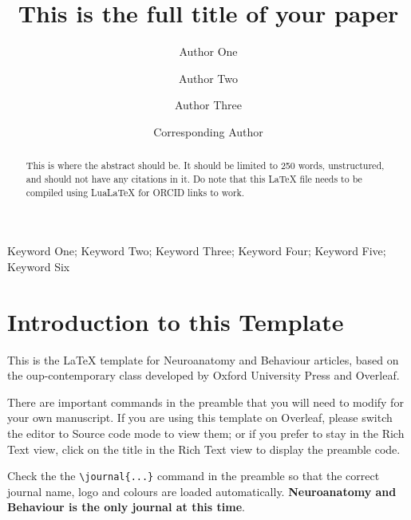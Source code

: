 \documentclass[a4paper,num-refs]{ehi-journals}
\title{This is the full title of your paper}
\author[1,\authfn{2}]{Author One\orcid{0000-0000-0000-0000}}
\author[1,2,\authfn{2}]{Author Two}
\author[1,2]{Author Three}
\author[1,\authfn{1}]{Corresponding Author}
\affil[1]{Affiliation 1}
\affil[2]{Affiliation 2}
\newcommand{\kwdone}{Keyword One}
\newcommand{\kwdtwo}{Keyword Two}
\newcommand{\kwdthree}{Keyword Three}
\newcommand{\kwdfour}{Keyword Four}
\newcommand{\kwdfive}{Keyword Five}
\newcommand{\kwdsix}{Keyword Six}
\begin{document}
\begin{frontmatter}
\maketitle
\begin{abstract}
This is where the abstract should be. It should be limited to 250 words, unstructured, and should not have any citations in it. Do note that this LaTeX file needs to be compiled using LuaLaTeX for ORCID links to work.
\end{abstract}

\begin{keywords}
\kwdone; \kwdtwo; \kwdthree; \kwdfour; \kwdfive; \kwdsix
\end{keywords}
\end{frontmatter}


\section{Introduction to this Template}


This is the \LaTeX{} template for Neuroanatomy and Behaviour articles, based on the oup-contemporary class developed by Oxford University Press and Overleaf. 

There are important commands in the preamble that you will need to modify for your own manuscript. If you are using this template on Overleaf, please switch the editor to Source code mode to view them; or if you prefer to stay in the Rich Text view, click on the title in the Rich Text view to display the preamble code.

Check the the \verb|\journal{...}| command in the preamble so that the correct journal name, logo and colours are loaded automatically. \textbf{Neuroanatomy and Behaviour is the only journal at this time}.
\end{document}
